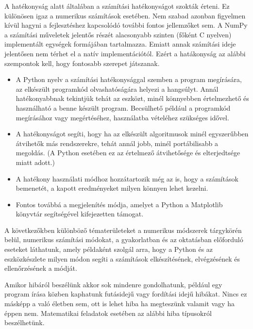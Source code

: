 

A hatékonyság alatt általában a számítási hatékonyságot szokták érteni. Ez különösen igaz a numerikus számítások esetében. Nem szabad azonban figyelmen kívül hagyni a fejlesztéshez kapcsolódó további fontos jellemzőket sem. A NumPy a számítási műveletek jelentős részét alacsonyabb szinten (főként C nyelven) implementált egységek formájában tartalmazza. Emiatt annak számítási ideje jelentősen nem térhet el a natív implementációtól. Ezért a hatákonyság az alábbi szempontok kell, hogy fontosabb szerepet játszanak.
\begin{itemize}
\item A Python nyelv a számítási hatékonysággal szemben a program megírására, az elkészült programkód olvashatóságára helyezi a hangsúlyt. Annál hatékonyabbnak tekintjük tehát az eszközt, minél könnyebben értelmezhető és használható a benne készült program. Becsülhető például a programkód megírásához vagy megértéséhez, használatba vételéhez szükséges idővel.
\item A hatékonyságot segíti, hogy ha az elkészült algoritmusok minél egyszerűbben átvihetők más rendszerekre, tehát annál jobb, minél portábilisabb a megoldás. (A Python esetében ez az értelmező átvihetősége és elterjedtsége miatt adott.)
\item A hatékony használati módhoz hozzátartozik még az is, hogy a számítások bemenetét, a kapott eredményeket milyen könnyen lehet kezelni.
\item Fontos továbbá a megjelenítés módja, amelyet a Python a Matplotlib könyvtár segítségével kifejezetten támogat.
\end{itemize}

A következőkben különböző tématerületeket a numerikus módszerek tárgykörén belül, numerikus számítási módokat, a gyakorlatban és az oktatásban előforduló eseteket láthatunk, amely példaként szolgál arra, hogy a Python és az eszközkészlete milyen módon segíti a számítások elkészítésének, elvégzésének és ellenőrzésének a módját.


Amikor hibáról beszélünk akkor sok mindenre gondolhatunk, például egy
program írása közben kaphatunk futásidejű vagy fordítási idejű hibákat.
Nincs ez másképp a való életben sem, ott is lehet hiba ha megteszünk valamit vagy
ha éppen nem. Matematikai feladatok
esetében az alábbi hiba típusokról beszélhetünk.

